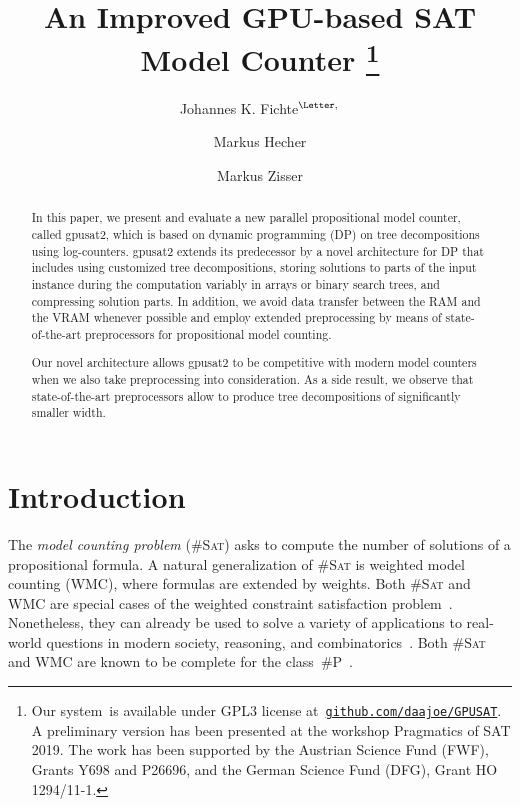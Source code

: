 \documentclass{llncs}
\title{An Improved GPU-based SAT Model Counter%
  \thanks{%
    Our system~\gpusatnu is available under GPL3 license
    at~\href{https://github.com/daajoe/GPUSAT/releases/tag/v2.001-pre}{\nolinkurl{github.com/daajoe/GPUSAT}}.
    A preliminary version has been presented at the workshop
    Pragmatics of SAT 2019. The work has been supported by the
    Austrian Science Fund (FWF), Grants Y698 and P26696, and the
    German Science Fund (DFG), Grant HO 1294/11-1.
  }%
%
}
\author{Johannes K. Fichte$^{\text{\Letter},}$\inst{1}\orcidID{0000-0002-8681-7470}%
  \and Markus Hecher\inst{2,3}\orcidID{0000-0003-0131-6771} \and
  Markus Zisser\inst{2}%
}%
\institute{TU Dresden, %
  Germany \email{johannes.fichte@tu-dresden.de} %
  \and TU Wien, %
  Austria \email{markus.\{hecher,zisser\}@tuwien.ac.at} \and %
  University of
  Potsdam, %
  Germany \email{hecher@uni-potsdam.de}
%
%
%
%
}
\newcommand{\sharpP}{\#P\xspace}
\newcommand{\cSAT}{\textsc{\#Sat}\xspace}%
\newcommand{\WMC}{\textsc{WMC}\xspace}%
\newcommand{\gpusatnu}{{\small\textsf{gpusat2}}\xspace}
\begin{document}
\maketitle

\begin{abstract}
  In this paper, we present and evaluate a new parallel propositional
  model counter, called \gpusatnu, which is based on dynamic
  programming (DP) on tree decompositions using log-counters.
  \gpusatnu extends its predecessor by a novel architecture for DP
  that includes using customized tree decompositions, storing
  solutions to parts of the input instance during the computation
  variably in arrays or binary search trees, and compressing solution
  parts. In addition, we avoid data transfer between the RAM and the
  VRAM whenever possible and employ extended preprocessing by means of
  state-of-the-art preprocessors for propositional model counting.

  Our novel architecture allows \gpusatnu to be competitive with
  modern model counters when we also take preprocessing into
  consideration. As a side result, we observe that state-of-the-art
  preprocessors allow to produce tree decompositions of significantly
  smaller width.
\end{abstract}

\section{Introduction}
The \emph{model counting problem} (\cSAT) asks to compute the number
of solutions of a propositional formula.
%
A natural generalization of \cSAT is weighted model counting (\WMC),
where formulas are extended by weights. 
%
Both \cSAT and \WMC are special cases of the weighted constraint
satisfaction problem~\cite{Larrosa02a,ShapiroHaralick81a}. Nonetheless,
they can
%
%
%
%
%
%
%
%
%
%
%
already be used to solve a variety of applications to real-world
questions in modern society, %
reasoning, and
combinatorics~\cite{ChoiBroeckDarwiche15a,DomshlakHoffmann07a,MeelEtAl17a,SangBeameKautz05a,XueChoiDarwiche12a}.
%
Both \cSAT and \WMC are known to be complete for the
class~\sharpP~\cite{BacchusDalmaoPitassi03,Roth96}.
\end{document}

